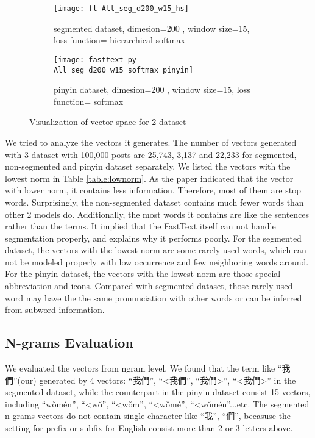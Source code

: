 \begin{figure}[H]
    \centering     
    \begin{subfigure}[b]{0.6\textwidth}
        \centering
        \texttt{[image: ft-All\_seg\_d200\_w15\_hs]}
        \caption{segmented dataset, dimesion=200 , window size=15, loss function=  hierarchical softmax}
    \end{subfigure}
    \begin{subfigure}[b]{0.6\textwidth}
        \centering
        \texttt{[image: fasttext-py-All\_seg\_d200\_w15\_softmax\_pinyin]}
        \caption{pinyin dataset,  dimesion=200 , window size=15, loss function= softmax}
    \end{subfigure}
    \caption{Visualization of vector space for 2 dataset}
    \label{tsne}
\end{figure}

We tried to analyze the vectors it generates. The number of vectors generated with 3 dataset with 100,000 posts are 25,743, 3,137 and 22,233 for segmented, non-segmented and pinyin dataset separately. 
We listed the vectors with the lowest norm in Table \ref{table:lownorm}. As the paper indicated that the vector with lower norm, it contains less information. 
Therefore, most of them are stop words. Surprisingly, the non-segmented dataset contains much fewer words than other 2 models do. 
Additionally, the most words it contains are like the sentences rather than the terms. It implied that the FastText itself can not handle segmentation properly, and explains why it performs poorly. 
For the segmented dataset, the vectors with the lowest norm are some rarely used words, which can not be modeled properly with low occurrence and few neighboring words around.
For the pinyin dataset, the vectors with the lowest norm are those special abbreviation and icons. Compared with segmented dataset, those rarely used word may have the the same pronunciation with other words or can be inferred from subword information.


\subsection{N-grams Evaluation}

We evaluated the vectors from ngram level. We found that the term like \enquote{我們}(our) generated by 4 vectors: \enquote{我們}, \enquote{\textless 我們}, \enquote{我們\textgreater}, \enquote{\textless 我們\textgreater} in the segmented dataset,
while the counterpart in the pinyin dataset consist 15 vectors, including \enquote{wǒmén}, \enquote{\textless wǒ}, \enquote{\textless wǒm}, \enquote{\textless wǒmé}, \enquote{\textless wǒmén}...etc. 
The segmented n-grams vectors do not contain single character like \enquote{我}, \enquote{們}, becasuse the setting for prefix or subfix for English consist more than 2 or 3 letters above.

